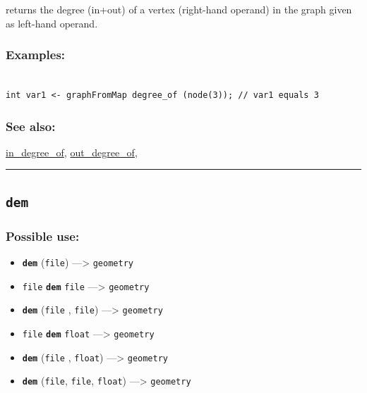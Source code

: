 \documentclass[]{book}
\providecommand{\tightlist}{%
  \setlength{\itemsep}{0pt}\setlength{\parskip}{0pt}}
\theoremstyle{definition}
\theoremstyle{definition}
\theoremstyle{definition}
\theoremstyle{remark}
\begin{document}
returns the degree (in+out) of a vertex (right-hand operand) in the
graph given as left-hand operand.

\subsubsection{Examples:}\label{examples-97}

\begin{verbatim}
 
int var1 <- graphFromMap degree_of (node(3)); // var1 equals 3
\end{verbatim}

\subsubsection{See also:}\label{see-also-76}

\href{operators-i-to-m.html\#in_degree_of}{in\_degree\_of},
\href{operators-n-to-r.html\#out_degree_of}{out\_degree\_of},

\begin{center}\rule{0.5\linewidth}{\linethickness}\end{center}

\subsection{\texorpdfstring{\texttt{dem}}{dem}}\label{dem}

\subsubsection{Possible use:}\label{possible-use-128}

\begin{itemize}
\tightlist
\item
  \textbf{\texttt{dem}} (\texttt{file}) ---\textgreater{}
  \texttt{geometry}
\item
  \texttt{file} \textbf{\texttt{dem}} \texttt{file} ---\textgreater{}
  \texttt{geometry}
\item
  \textbf{\texttt{dem}} (\texttt{file} , \texttt{file})
  ---\textgreater{} \texttt{geometry}
\item
  \texttt{file} \textbf{\texttt{dem}} \texttt{float} ---\textgreater{}
  \texttt{geometry}
\item
  \textbf{\texttt{dem}} (\texttt{file} , \texttt{float})
  ---\textgreater{} \texttt{geometry}
\item
  \textbf{\texttt{dem}} (\texttt{file}, \texttt{file}, \texttt{float})
  ---\textgreater{} \texttt{geometry}
\end{itemize}
\end{document}
